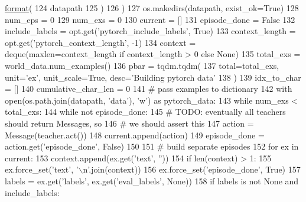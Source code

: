 \begin{DoxyCode}
      \hyperlink{namespaceparlai_1_1chat__service_1_1services_1_1messenger_1_1shared__utils_a32e2e2022b824fbaf80c747160b52a76}{format}(
124             datapath
125         )
126     )
127     os.makedirs(datapath, exist\_ok=\textcolor{keyword}{True})
128     num\_eps = 0
129     num\_exs = 0
130     current = []
131     episode\_done = \textcolor{keyword}{False}
132     include\_labels = opt.get(\textcolor{stringliteral}{'pytorch\_include\_labels'}, \textcolor{keyword}{True})
133     context\_length = opt.get(\textcolor{stringliteral}{'pytorch\_context\_length'}, -1)
134     context = deque(maxlen=context\_length \textcolor{keywordflow}{if} context\_length > 0 \textcolor{keywordflow}{else} \textcolor{keywordtype}{None})
135     total\_exs = world\_data.num\_examples()
136     pbar = tqdm.tqdm(
137         total=total\_exs, unit=\textcolor{stringliteral}{'ex'}, unit\_scale=\textcolor{keyword}{True}, desc=\textcolor{stringliteral}{'Building pytorch data'}
138     )
139     idx\_to\_char = []
140     cumulative\_char\_len = 0
141     \textcolor{comment}{# pass examples to dictionary}
142     with open(os.path.join(datapath, \textcolor{stringliteral}{'data'}), \textcolor{stringliteral}{'w'}) \textcolor{keyword}{as} pytorch\_data:
143         \textcolor{keywordflow}{while} num\_exs < total\_exs:
144             \textcolor{keywordflow}{while} \textcolor{keywordflow}{not} episode\_done:
145                 \textcolor{comment}{# TODO: eventually all teachers should return Messages, so}
146                 \textcolor{comment}{# we should assert this}
147                 action = Message(teacher.act())
148                 current.append(action)
149                 episode\_done = action.get(\textcolor{stringliteral}{'episode\_done'}, \textcolor{keyword}{False})
150 
151             \textcolor{comment}{# build separate episodes}
152             \textcolor{keywordflow}{for} ex \textcolor{keywordflow}{in} current:
153                 context.append(ex.get(\textcolor{stringliteral}{'text'}, \textcolor{stringliteral}{''}))
154                 \textcolor{keywordflow}{if} len(context) > 1:
155                     ex.force\_set(\textcolor{stringliteral}{'text'}, \textcolor{stringliteral}{'\(\backslash\)n'}.join(context))
156                 ex.force\_set(\textcolor{stringliteral}{'episode\_done'}, \textcolor{keyword}{True})
157                 labels = ex.get(\textcolor{stringliteral}{'labels'}, ex.get(\textcolor{stringliteral}{'eval\_labels'}, \textcolor{keywordtype}{None}))
158                 \textcolor{keywordflow}{if} labels \textcolor{keywordflow}{is} \textcolor{keywordflow}{not} \textcolor{keywordtype}{None} \textcolor{keywordflow}{and} include\_labels:

\end{DoxyCode}
